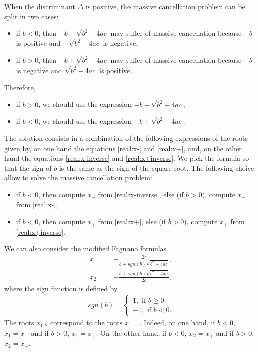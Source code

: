 When the discriminant $\Delta$ is positive, the massive cancellation problem can be split in two cases:
\begin{itemize}
\item if $b<0$, then $-b-\sqrt{b^2-4ac}$ may suffer of massive cancellation
because $-b$ is positive and $-\sqrt{b^2-4ac}$ is negative,
\item if $b>0$, then $-b+\sqrt{b^2-4ac}$ may suffer of massive cancellation because 
$-b$ is negative and $\sqrt{b^2-4ac}$ is positive.
\end{itemize}
Therefore, 
\begin{itemize}
\item if $b>0$, we should use the expression $-b-\sqrt{b^2-4ac}$,
\item if $b<0$, we should use the expression $-b+\sqrt{b^2-4ac}$.
\end{itemize}
The solution consists in a combination of the following expressions of the 
roots given by, on one hand the equations \ref{real:x-} and \ref{real:x+},
and, on the other hand the equations \ref{real:x-inverse} and \ref{real:x+inverse}.
We pick the formula so that the sign of $b$ is the 
same as the sign of the square root.
The following choice allow to solve the massive cancellation problem:
\begin{itemize}
\item if $b<0$, then compute $x_-$ from \ref{real:x-inverse}, else 
(if $b>0$), compute $x_-$ from \ref{real:x-},
\item if $b<0$, then compute $x_+$ from \ref{real:x+}, else 
(if $b>0$), compute $x_+$ from \ref{real:x+inverse}.
\end{itemize}

We can also consider the modified Fagnano formulas
\begin{eqnarray}
x_1 &=& -\frac{2c}{b+sgn(b)\sqrt{b^2-4ac}}, \\
x_2 &=& -\frac{b+sgn(b)\sqrt{b^2-4ac}}{2a}, 
\end{eqnarray}
where the sign function is defined by 
\begin{eqnarray}
sgn(b)=\left\{\begin{array}{l}
1, \textrm{ if } b\geq 0,\\
-1, \textrm{ if } b< 0.
\end{array}\right.
\end{eqnarray}
The roots $x_{1,2}$ correspond to the roots $x_{+,-}$. Indeed, on one hand, 
if $b<0$, $x_1=x_-$ and if $b>0$, $x_1=x_+$. On the other hand, if $b<0$, $x_2=x_+$ and
if $b>0$, $x_2=x_-$.

